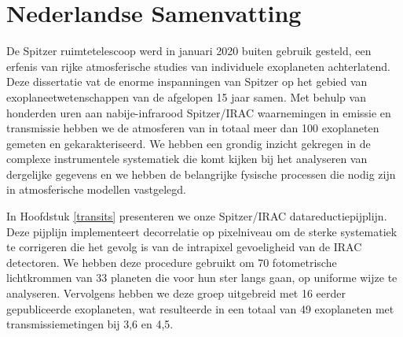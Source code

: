 
\renewcommand{\thefigure}{\Alph{figure}}

\setcounter{figure}{0}

\setcounter{footnote}{0}

\renewcommand\chapterautorefname{hoofdstuk}%
\cleardoublepage

\chapter{Nederlandse Samenvatting}

De Spitzer ruimtetelescoop werd in januari 2020 buiten gebruik gesteld, een erfenis van rijke atmosferische studies van individuele exoplaneten achterlatend. Deze dissertatie vat de enorme inspanningen van Spitzer op het gebied van exoplaneetwetenschappen van de afgelopen 15 jaar samen. Met behulp van honderden uren aan nabije-infrarood Spitzer/IRAC waarnemingen in emissie en transmissie hebben we de atmosferen van in totaal meer dan 100 exoplaneten gemeten en gekarakteriseerd. We hebben een grondig inzicht gekregen in de complexe instrumentele systematiek die komt kijken bij het analyseren van dergelijke gegevens en we hebben de belangrijke fysische processen die nodig zijn in atmosferische modellen vastgelegd.

In Hoofdstuk \ref{transits} presenteren we onze Spitzer/IRAC datareductiepijplijn. Deze pijplijn implementeert decorrelatie op pixelniveau om de sterke systematiek te corrigeren die het gevolg is van de intrapixel gevoeligheid van de IRAC detectoren. We hebben deze procedure gebruikt om 70 fotometrische lichtkrommen van 33 planeten die voor hun ster langs gaan, op uniforme wijze te analyseren. Vervolgens hebben we deze groep uitgebreid met 16 eerder gepubliceerde exoplaneten, wat resulteerde in een totaal van 49 exoplaneten met transmissiemetingen bij 3,6 en 4,5\um.

